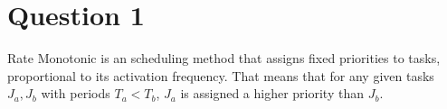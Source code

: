 \section{Question 1}

Rate Monotonic is an scheduling method that assigns fixed priorities to tasks,
proportional to its activation frequency. That means that for any given tasks
$J_a,J_b$ with periods $T_a < T_b$, $J_a$ is assigned a higher priority than
$J_b$.
